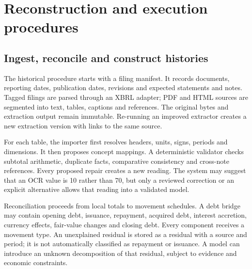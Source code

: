 \chapter{Reconstruction and execution procedures}
\label{ch:execution}

\section{Ingest, reconcile and construct histories}

The historical procedure starts with a filing manifest. It records documents,
reporting dates, publication dates, revisions and expected statements and
notes. Tagged filings are parsed through an XBRL adapter; PDF and HTML sources
are segmented into text, tables, captions and references. The original bytes
and extraction output remain immutable. Re-running an improved extractor
creates a new extraction version with links to the same source.

For each table, the importer first resolves headers, units, signs, periods and
dimensions. It then proposes concept mappings. A deterministic validator checks
subtotal arithmetic, duplicate facts, comparative consistency and cross-note
references. Every proposed repair creates a new reading. The system may suggest
that an OCR value is 10 rather than 70, but only a reviewed correction or an
explicit alternative allows that reading into a validated model.

Reconciliation proceeds from local totals to movement schedules. A debt bridge
may contain opening debt, issuance, repayment, acquired debt, interest
accretion, currency effects, fair-value changes and closing debt. Every
component receives a movement type. An unexplained residual is stored as a
residual with a source and period; it is not automatically classified as
repayment or issuance. A model can introduce an unknown decomposition of that
residual, subject to evidence and economic constraints.

